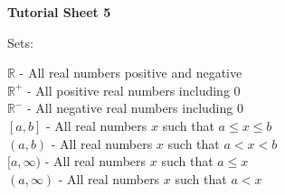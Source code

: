 \documentclass[11pt,a4paper,titlepage,oneside,openany]{article}
\numberwithin{equation}{section}
\numberwithin{algorithm}{section}
\numberwithin{figure}{section}
\numberwithin{table}{section}
\newcommand{\mb}{\mathbb}
\begin{document}
\begin{center}
  \textbf{Tutorial Sheet 5}
\end{center}
Sets:\begin{multicols}{2}\small
  $\quad$\\
  $\mb{R}$ - All real numbers positive and negative\\
    $\mb{R}^+$ - All positive real numbers including $0$\\
    $\mb{R}^-$ - All negative real numbers including $0$
    \columnbreak
    \\$[a,b]$ - All real numbers $x$ such that $a \le x \le b$\\
    $(a,b)$ - All real numbers $x$ such that $a < x < b$\\
    $[a,\infty)$ - All real numbers $x$ such that $a \le x$\\
    $(a,\infty)$ - All real numbers $x$ such that $a < x$
  \end{multicols}
\end{document}
